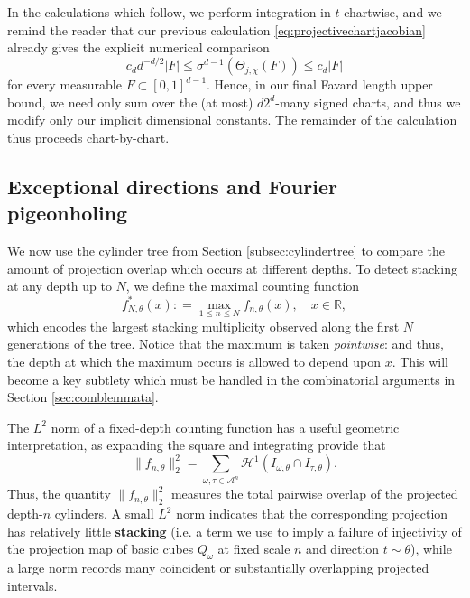 \documentclass[12pt]{amsart}
\numberwithin{equation}{section}
\begin{document}
In the calculations which follow, we perform integration in $t$ chartwise, and we remind the reader that our previous calculation \eqref{eq:projectivechartjacobian} already gives the explicit numerical comparison
\begin{equation}\label{eq:chartmeasurecomparison}
 c_dd^{-d/2}|F|
 \leq \sigma^{d-1}(\Theta_{j,\chi}(F))
 \leq c_d|F|
\end{equation}
for every measurable $F\subset[0,1]^{d-1}$.  Hence, in our final Favard length upper bound, we need only sum over the (at most)
$d2^d$-many signed charts, and thus we modify only our implicit dimensional constants. The remainder of the calculation thus proceeds chart-by-chart.



\subsection{Exceptional directions and Fourier pigeonholing}\label{subsec:countingandlowmult}
We now use the cylinder tree from Section \ref{subsec:cylindertree} to compare the amount of projection overlap which occurs at different depths. To detect stacking at any depth up to $N$, we define the maximal counting function
$$
f_{N,\theta}^* (x) : = \max_{1 \leq n \leq N} f_{n,\theta} (x), \quad  x \in \mathbb{R},
$$
which encodes the largest stacking multiplicity observed along the first $N$ generations of the tree. Notice that the maximum is taken \textit{pointwise}: and thus, the depth at which the maximum occurs is allowed to depend upon $x$. This will become a key subtlety which must be handled in the combinatorial arguments in Section \ref{sec:comblemmata}.

The $L^2$ norm of a fixed-depth counting function has a useful geometric interpretation, as expanding the square and integrating provide that
\begin{equation}\label{eq:L2overlapidentity}
\|f_{n,\theta}\|_2^2
=\sum_{\omega,\tau\in\mathcal A^n}
\mathcal H^1(I_{\omega,\theta}\cap I_{\tau,\theta}).
\end{equation}
Thus, the quantity $\|f_{n,\theta}\|_2^2$ measures the total pairwise overlap of the projected depth-$n$ cylinders. A small $L^2$ norm indicates that the corresponding projection has relatively little \textbf{stacking} (i.e. a term we use to imply a failure of injectivity of the projection map of basic cubes $Q_{\omega}$ at fixed scale $n$ and direction $t \sim \theta$), while a large norm records many coincident or substantially overlapping projected intervals.
\end{document}
